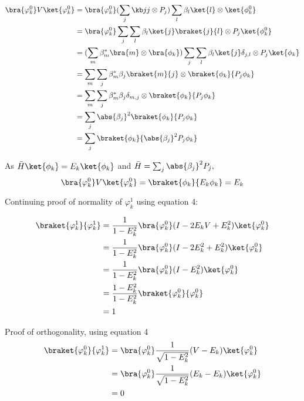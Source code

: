 \begin{align*}
\bra{\varphi_k^0} V \ket{\varphi_k^0} &= \bra{\varphi_k^0} (\sum_j \kb j j \otimes P_j) \sum_l \beta_l \ket{l} \otimes \ket{\phi_k^0}\\
&= \bra{\varphi_k^0}\sum_j \sum_l \beta_l \ket{j} \braket{j}{l} \otimes P_j \ket{\phi_k^0}\\
&=(\sum_m \beta_m^* \bra{m} \otimes \bra{\phi_k}) \sum_j \sum_l \beta_l \ket{j} \delta_{j,l} \otimes P_j \ket{\phi_k}\\
&= \sum_m \sum_j \beta_m^* \beta_j \braket{m}{j} \otimes \braket{\phi_k}{P_j \phi_k}\\
&= \sum_m \sum_j \beta_m^* \beta_j \delta_{m,j} \otimes \braket{\phi_k}{P_j \phi_k}\\
&= \sum_j \abs{\beta_j}^2 \braket{\phi_k}{P_j \phi_k}\\
&= \sum_j \braket{\phi_k}{ \abs{\beta_j}^2  P_j \phi_k}
\end{align*}

As $\bar{H}\ket{\phi_k} = E_k\ket{\phi_k}$ and $\bar{H} = \sum_j \abs{\beta_j}^2  P_j,$
\begin{equation}
\bra{\varphi_k^0} V \ket{\varphi_k^0} = \braket{\phi_k}{E_k \phi_k}
= E_k
\end{equation}

Continuing proof of normality of $\varphi_k^1$ using equation 4:



\begin{align*}
\braket{\varphi_k^1}{\varphi_k^1} &= \frac{1}{1 - E^2_k} \bra{\varphi_k^0} (I - 2 E_kV + E_k^2) \ket{\varphi_k^0}\\
&= \frac{1}{1 - E^2_k} \bra{\varphi_k^0} (I - 2 E_k^2 + E_k^2) \ket{\varphi_k^0}\\
&= \frac{1}{1 - E^2_k} \bra{\varphi_k^0} (I -  E_k^2) \ket{\varphi_k^0}\\
&= \frac{1- E^2_k}{1 - E^2_k} \braket{\varphi_k^0}{\varphi_k^0}\\
&= 1
\end{align*}

Proof of orthogonality, using equation 4
\begin{align*}
\braket{\varphi_k^0}{\varphi_k^1} &= \bra{\varphi_k^0}  \frac{1}{\sqrt{1 - E^2_k}}(V-E_k) \ket{\varphi_k^0}\\
&= \bra{\varphi_k^0}  \frac{1}{\sqrt{1 - E^2_k}}(E_k-E_k) \ket{\varphi_k^0}\\
&= 0
\end{align*}

